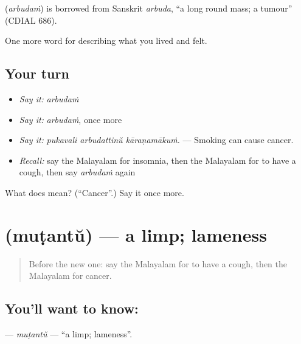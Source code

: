 \begin{cousinweb}
\textbf{} (\emph{arbudaṁ}) is borrowed from Sanskrit \emph{arbuda}, \textquotedblleft{}a long round mass; a tumour\textquotedblright{} (CDIAL 686).
\end{cousinweb}

\begin{grammarlens}[title={What you've built}]
One more word for describing what you lived and felt.
\end{grammarlens}

\subsection*{Your turn}
\begin{itemize}
\raggedright
  \item \emph{Say it:} \emph{arbudaṁ}
  \item \emph{Say it:} \emph{arbudaṁ}, once more
  \item \emph{Say it:} \emph{pukavali arbudattinŭ kāraṇamākuṁ.} — Smoking can cause cancer.
  \item \emph{Recall:} say the Malayalam for insomnia, then the Malayalam for to have a cough, then say \emph{arbudaṁ} again
\end{itemize}

\begin{tcolorbox}[breakable,colback=teal!4,colframe=teal!35!black,title={Before you move on}]
What does  mean? (\textquotedblleft{}Cancer\textquotedblright{}.) Say it once more.
\end{tcolorbox}
\section[\texorpdfstring{\ml{മുടന്ത്} (muṭantŭ)}{മുടന്ത് (muṭantŭ)}]{ (muṭantŭ) — a limp; lameness}

\label{lesson:ML-C535-mutantu}



\begin{quote}
Before the new one: say the Malayalam for to have a cough, then the Malayalam for cancer.
\end{quote}

\subsection*{You'll want to know: }
\textbf{} — \emph{muṭantŭ} — \textquotedblleft{}a limp; lameness\textquotedblright{}.

